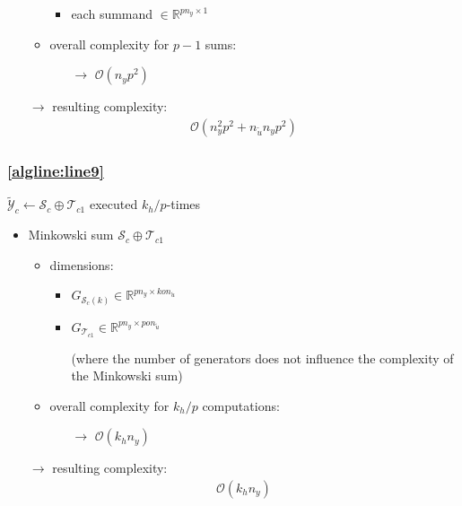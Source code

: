 \documentclass{article}
\begin{document}
\begin{itemize}
\begin{itemize}
        \begin{itemize}
            \item each summand $\in \mathbb{R}^{pn_y \times 1}$
        \end{itemize}
        \item overall complexity for $p-1$ sums:%
        \begin{itemize}
            \item[$\rightarrow$] $\mathcal{O}(n_y p^2)$
        \end{itemize}
    \end{itemize}    
    \item[$\rightarrow$] resulting complexity: \begin{align*}
        \mathcal{O}(n_y^2 p^2 + n_{\tilde{u}} n_y p^2)
    \end{align*}
\end{itemize}

\subsubsection{\cref{algline:line9}} 
$\tilde{\mathcal{Y}}_c \gets \mathcal{S}_c \oplus \mathcal{T}_{c1}$
executed $k_h/p$-times
\begin{itemize}
    \item Minkowski sum $\mathcal{S}_c \oplus \mathcal{T}_{c1}$
    \begin{itemize}
        \item dimensions:
        \begin{itemize}        
            \item $G_{\mathcal{S}_c(k)} \in \mathbb{R}^{pn_y \times k o n_{\tilde{u}}}$
            \item $G_{\mathcal{T}_{c1}} \in \mathbb{R}^{pn_y \times pon_{\tilde{u}}}$ 
            \item[] (where the number of generators does not influence the complexity of the Minkowski sum)
        \end{itemize}
        \item overall complexity for $k_h/p$ computations:
        \begin{itemize}
            \item[$\rightarrow$] $\mathcal{O}(k_h n_y)$
        \end{itemize}
    \end{itemize}    
    \item[$\rightarrow$] resulting complexity: \begin{align*}
        \mathcal{O}(k_h n_y)
    \end{align*}
\end{itemize}
\end{document}
